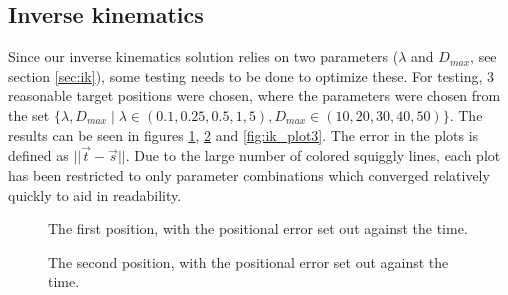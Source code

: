 \documentclass[a4paper]{article}
\begin{document}
\subsection{Inverse kinematics}
\FloatBarrier
Since our inverse kinematics solution relies on two parameters
($\lambda$ and $D_{max}$, see section \ref{sec:ik}), some testing needs to be
done to optimize these. For testing, 3 reasonable target positions were chosen,
where the parameters were chosen from the set $\{\lambda, D_{max} \mid \lambda \in
  (0.1, 0.25, 0.5, 1, 5), D_{max} \in (10, 20, 30, 40, 50)\}$. The results can be
seen in figures \ref{fig:ik_plot1}, \ref{fig:ik_plot2} and \ref{fig:ik_plot3}.
The error in the plots is defined as $|| \vec{t} - \vec{s} ||$. Due to the large
number of colored squiggly lines, each plot has been restricted to only
parameter combinations which converged relatively quickly to aid in readability.

\begin{figure}[htbp]
  \centering
  \caption{The first position, with the positional error set out against
         the time.}
  \label{fig:ik_plot1}
\end{figure}

\begin{figure}[htbp]
  \centering
  \caption{The second position, with the positional error set out against
         the time.}
  \label{fig:ik_plot2}
\end{figure}
\end{document}
